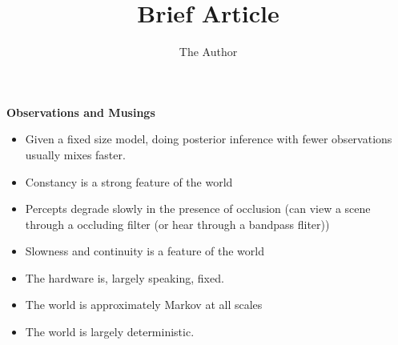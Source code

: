\documentclass[11pt]{amsart}
\title{Brief Article}
\author{The Author}
\begin{document}
\maketitle

{\bf Observations and Musings}

\begin{itemize}
\item Given a fixed size model, doing posterior inference with fewer observations usually mixes faster.
\item Constancy is a strong feature of the world
\item Percepts degrade slowly in the presence of occlusion (can view a scene through a occluding filter (or hear through a bandpass fliter))
\item Slowness and continuity is a feature of the world
\item The hardware is, largely speaking, fixed.
\item The world is approximately Markov at all scales
\item The world is largely deterministic.
\end{itemize}
\end{document}
